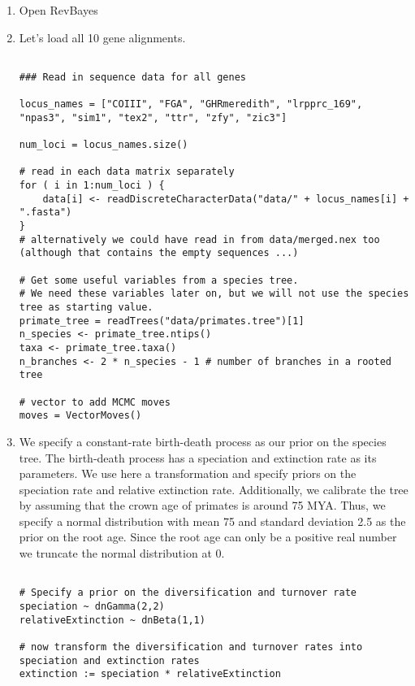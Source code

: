 \begin{enumerate}
\item Open RevBayes
\item Let's load all 10 gene alignments.

{\tt \begin{snugshade*}
\begin{lstlisting}

### Read in sequence data for all genes

locus_names = ["COIII", "FGA", "GHRmeredith", "lrpprc_169", "npas3", "sim1", "tex2", "ttr", "zfy", "zic3"]

num_loci = locus_names.size()

# read in each data matrix separately
for ( i in 1:num_loci ) {
    data[i] <- readDiscreteCharacterData("data/" + locus_names[i] + ".fasta")
}
# alternatively we could have read in from data/merged.nex too (although that contains the empty sequences ...)

# Get some useful variables from a species tree.
# We need these variables later on, but we will not use the species tree as starting value.
primate_tree = readTrees("data/primates.tree")[1]
n_species <- primate_tree.ntips()
taxa <- primate_tree.taxa()
n_branches <- 2 * n_species - 1 # number of branches in a rooted tree

# vector to add MCMC moves
moves = VectorMoves()

\end{lstlisting}
\end{snugshade*}}

\item We specify a constant-rate birth-death process as our prior on the species tree. 
The birth-death process has a speciation and extinction rate as its parameters. 
We use here a transformation and specify priors on the speciation rate and relative extinction rate.
Additionally, we calibrate the tree by assuming that the crown age of primates is around 75 MYA.
Thus, we specify a normal distribution with mean 75 and standard deviation 2.5 as the prior on the root age.
Since the root age can only be a positive real number we truncate the normal distribution at 0.

{\tt \begin{snugshade*}
\begin{lstlisting}

# Specify a prior on the diversification and turnover rate
speciation ~ dnGamma(2,2)
relativeExtinction ~ dnBeta(1,1)

# now transform the diversification and turnover rates into speciation and extinction rates
extinction := speciation * relativeExtinction


\end{lstlisting}
\end{snugshade*}}
\end{enumerate}
